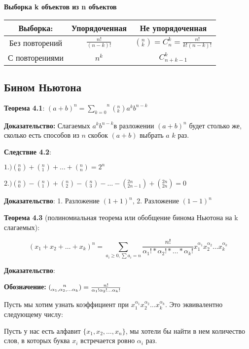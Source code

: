 \documentclass[openany]{article}
\newcommand{\Sum}[2]{\overset{#2}{\underset{#1}{\sum}}}
\begin{document}
   \textbf{Выборка k объектов из n объектов}

    \begin{tabular}{|c|c|c|}
        \hline
        Выборка: & Упорядоченная & Не упорядоченная \\
        \hline
        Без повторений & $\frac{n!}{(n-k)!}$ & $({}^n_k) = C_n^k = \frac{n!}{k!(n-k)!}$ \\
        \hline
        С повторениями & $n^k$ & $C_{n+k-1}^k$ \\
        \hline
    \end{tabular}

   \subsection{Бином Ньютона}

   \textbf{Теорема 4.1}: $(a + b)^n = \Sum{k=0}{n}({}^n_k)a^kb^{n-k}$

   \textbf{Доказательство:} Слагаемых $a^kb^{n-k} $в разложении $(a + b)^n$ будет столько же, сколько есть способов из $n$ скобок $(a + b)$ выбрать $a$ $k$ раз.

   \textbf{Следствие 4.2}:

   $1.) ({}_0^n) + ({}_1^n) + \ldots + ({}_n^n) = 2^n$

   $2.) ({}_0^n) - ({}_1^n) + ({}_2^n) - ({}_3^n) - \ldots - ({}_{2n-1}^{2n}) + ({}_{2n}^{2n}) = 0$ 

   \textbf{Доказательство}: 1. Разложение $(1 + 1)^n$, 2. Разложение $(1 - 1)^n$

   \textbf{Теорема 4.3} (полиномиальная теорема или обобщение бинома Ньютона на k слагаемых):

   $$(x_1 + x_2 + \ldots + x_k)^n = \sum\limits_{a_i \ge 0, \sum a_i = n} \frac{n!}{\alpha_1! * \alpha_2! * \ldots * \alpha_k!}x_1^{\alpha_1}x_2^{\alpha_2}\ldots x_k^{\alpha_k}$$

   \textbf{Доказательство}:

   \textbf{Обозначение:} $({}^{\hspace{0.6cm}n}_{\alpha_1, \alpha_2, \ldots \alpha_k}) = \frac{n!}{\alpha_1! \alpha_2! \ldots \alpha_k!}$

   Пусть мы хотим узнать коэффициент при $x_1^{\alpha_1}x_2^{\alpha_2}\ldots x_k^{\alpha_k}$. Это эквивалентно следующему числу:

   Пусть у нас есть алфавит $\{x_1, x_2, \ldots, x_n\}$, мы хотели бы найти в нем количество слов, в которых буква $x_i$ встречается ровно $\alpha_i$ раз.
\end{document}
